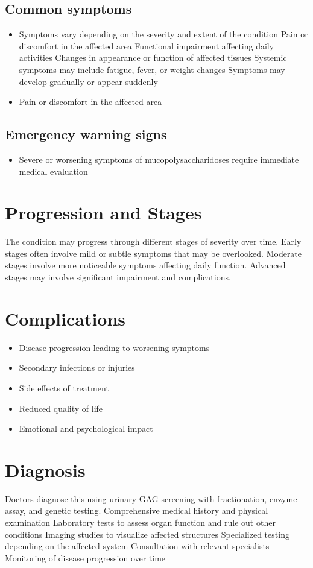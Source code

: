 \subsection{Common symptoms}
\begin{itemize}[noitemsep]
  \item Symptoms vary depending on the severity and extent of the condition Pain or discomfort in the affected area Functional impairment affecting daily activities Changes in appearance or function of affected tissues Systemic symptoms may include fatigue, fever, or weight changes Symptoms may develop gradually or appear suddenly
  \item Pain or discomfort in the affected area
  \end{itemize}

\subsection{Emergency warning signs}
\begin{itemize}[noitemsep]
  \item Severe or worsening symptoms of mucopolysaccharidoses require immediate medical evaluation
\end{itemize}
\section{Progression and Stages}
The condition may progress through different stages of severity over time. Early stages often involve mild or subtle symptoms that may be overlooked. Moderate stages involve more noticeable symptoms affecting daily function. Advanced stages may involve significant impairment and complications.
\section{Complications}
\begin{itemize}[noitemsep]
  \item Disease progression leading to worsening symptoms
  \item Secondary infections or injuries
  \item Side effects of treatment
  \item Reduced quality of life
  \item Emotional and psychological impact
\end{itemize}
\section{Diagnosis}
Doctors diagnose this using urinary GAG screening with fractionation, enzyme assay, and genetic testing. Comprehensive medical history and physical examination Laboratory tests to assess organ function and rule out other conditions Imaging studies to visualize affected structures Specialized testing depending on the affected system Consultation with relevant specialists Monitoring of disease progression over time

